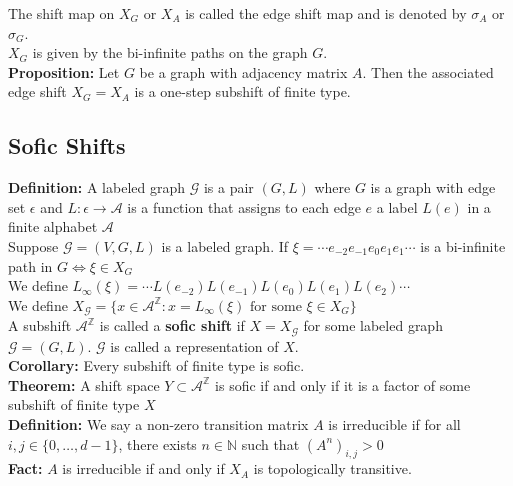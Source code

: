 \documentclass[12pt]{article}
\begin{document}
The shift map on $X_G$ or $X_A$ is called the edge shift map and is denoted by $\sigma_A$ or $\sigma_G$.\\

$X_G$ is given by the bi-infinite paths on the graph $G$.\\

\textbf{Proposition:} Let $G$ be a graph with adjacency matrix $A$. Then the associated edge shift $X_G = X_A$ is a one-step subshift of finite type.

\subsection{Sofic Shifts}

\textbf{Definition:} A labeled graph $\mathcal{G}$ is a pair $(G, L)$ where $G$ is a graph with edge set $\epsilon$ and $L: \epsilon \to \mathcal{A}$ is a function that assigns to each edge $e$ a label $L(e)$ in a finite alphabet $\mathcal{A}$\\

Suppose $\mathcal{G} = (V, G, L)$ is a labeled graph. If $\xi = \cdots e_{-2}e_{-1}e_0e_1e_1 \cdots$ is a bi-infinite path in $G \iff \xi \in X_G$\\

We define $L_{\infty}(\xi) = \cdots L(e_{-2}) L(e_{-1}) L(e_0) L(e_1) L(e_2) \cdots$\\

We define $X_{\mathcal{G}} = \{x \in \mathcal{A}^{\mathbb{Z}} : x = L_{\infty}(\xi) \text{ for some } \xi \in X_G \}$\\

A subshift $\mathcal{A}^{\mathbb{Z}}$ is called a \textbf{sofic shift} if $X = X_{\mathcal{G}}$ for some labeled graph $\mathcal{G} = (G, L)$. $\mathcal{G}$ is called a representation of $X$.\\

\textbf{Corollary:} Every subshift of finite type is sofic.\\

\textbf{Theorem:} A shift space $Y \subset \mathcal{A}^{\mathbb{Z}}$ is sofic if and only if it is a factor of some subshift of finite type $X$\\

\textbf{Definition:} We say a non-zero transition matrix $A$ is irreducible if for all $i, j \in \{0, \ldots, d-1\}$, there exists $n \in \mathbb{N}$ such that $(A^n)_{i, j} > 0$\\

\textbf{Fact:} $A$ is irreducible if and only if $X_A$ is topologically transitive.\\
\end{document}
